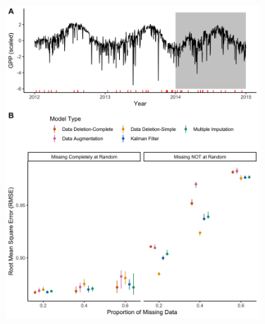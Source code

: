 \documentclass[12pt,english]{article} %
\begin{document}
\begin{linenumbers}
\begin{spacing}{1.9}
\begin{flushleft}
\begin{figure}
    \label{fig:ParamRec_Pois}
\end{figure}

\begin{figure}
    \centering
    \noindent\includegraphics[width = 0.85\textwidth]{Figures/MockedUpFigures/RMSE_FullFigure_NoLineWithErrorBar_gaussian_auSable.png}

    \caption{}

    \label{fig:RMSE_Gaus}
\end{figure}


\end{flushleft}
\end{spacing}
\end{linenumbers}
\end{document}
